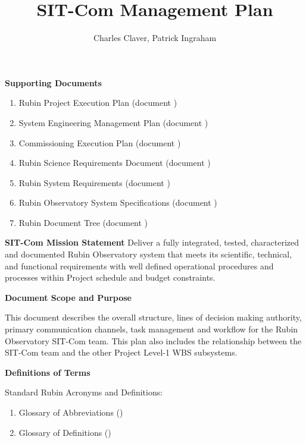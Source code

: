 \documentclass[SE,lsstdraft,authoryear,toc]{lsstdoc}
\title{SIT-Com Management Plan}
\author{%
Charles Claver, Patrick Ingraham
}
\date{\vcsDate}
\begin{document}
\maketitle


\textbf{Supporting Documents}

    \begin{enumerate}
        \item Rubin Project Execution Plan (document )

        \item System Engineering Management Plan (document )

        \item Commissioning Execution Plan (document )

        \item Rubin Science Requirements Document (document )

        \item Rubin System Requirements (document )

        \item Rubin Observatory System Specifications (document )

        \item Rubin Document Tree (document )

    \end{enumerate}

\textbf{SIT-Com Mission Statement}
Deliver a fully integrated, tested, characterized and documented Rubin Observatory system that meets its scientific, technical, and functional requirements with well defined operational procedures and processes within Project schedule and budget constraints.

\textbf{Document Scope and Purpose}
\label{sec:Scope}

This document describes the overall structure, lines of decision making authority, primary communication channels, task management and workflow for the Rubin Observatory SIT-Com team.
This plan also includes the relationship between the SIT-Com team and the other Project Level-1 WBS subsystems.

\textbf{Definitions of Terms}

Standard Rubin Acronyms and Definitions:
\begin{enumerate}
    \item Glossary of Abbreviations ()
    \item Glossary of Definitions ()
\end{enumerate}
\end{document}

